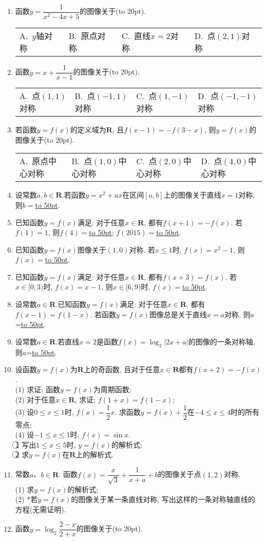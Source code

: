 \documentclass[10pt,a4paper]{article}
\newcommand{\blank}[1]{\underline{\hbox to #1pt{}}}
\newcommand{\bracket}[1]{(\hbox to #1pt{})}
\newcommand{\fourch}[4]{\par\begin{tabular}{p{.23\textwidth}p{.23\textwidth}p{.23\textwidth}p{.23\textwidth}}
A.~#1 &B.~#2& C.~#3& D.~#4
\end{tabular}}
\begin{document}
\begin{enumerate}[1.]
\item 函数$y=\dfrac 1{x^2-4x+5}$的图像关于\bracket{20}.
\fourch{$y$轴对称}{原点对称}{直线$x=2$对称}{点$(2,1)$对称}
\item 函数$y=x+\dfrac 1{x-1}$的图像关于\bracket{20}.
\fourch{点$(1,1)$对称}{点$(-1,1)$对称}{点$(1,-1)$对称}{点$(-1,-1)$对称}
\item 若函数$y=f(x)$的定义域为$\mathbf{R}$, 且$f(x-1)=-f(3-x)$, 则$y=f(x)$的图像关于\bracket{20}.
\fourch{原点中心对称}{点$(1,0)$中心对称}{点$(2,0)$中心对称}{点$(4,0)$中心对称}
\item 设常数$a,b\in \mathbf{R}$.若函数$y=x^2+ax$在区间$[a,b]$上的图像关于直线$x=1$对称, 则$b=$\blank{50}.
\item 已知函数$y=f(x)$满足: 对于任意$x\in \mathbf{R}$, 都有$f(x+1)=-f(x)$. 若$f(1)=1$, 则$f(4)=$\blank{50}; $f(2015)=$\blank{50}.
\item 已知函数$y=f(x)$图像关于$(1,0)$对称. 若$x\le 1$时, $f(x)=x^2-1$, 则$f(x)=$\blank{50}.
\item 已知函数$y=f(x)$满足: 对于任意$x\in \mathbf{R}$, 都有$f(x+3)=f(x)$. 若$x\in [0,3)$时, $f(x)=x-1$, 则$x\in [6,9)$时, $f(x)=$\blank{50}.
\item 设常数$a\in \mathbf{R}$.已知函数$y=f(x)$满足: 对于任意$x\in \mathbf{R}$, 都有$f(x-1)=f(1-x)$. 若函数$y=f(x)$图像总是关于直线$x=a$对称, 则$a$=\blank{50}.
\item 设常数$a\in \mathbf{R}$.若直线$x=2$是函数$f(x)=\log_3|2x+a|$的图像的一条对称轴, 则$a$=\blank{50}.
\item 设函数$y=f(x)$为$\mathbf{R}$上的奇函数, 且对于任意$x\in \mathbf{R}$都有$f(x+2)=-f(x)$.\\
(1) 求证: 函数$y=f(x)$为周期函数;\\
(2) 对于任意$x\in \mathbf{R}$, 求证: $f(1+x)=f(1-x)$;\\
(3) 设$0\le x\le 1$时, $f(x)=\dfrac 12x$. 求函数$y=f(x)+\dfrac 12$在$-4\le x\le 4$时的所有零点;\\
(4) 设$-1\le x\le 1$时, $f(x)=\sin x$.\\
\textcircled{1} 写出$1\le x\le 5$时, $y=f(x)$的解析式;\\
\textcircled{2} 求$y=f(x)$在$\mathbf{R}$上的解析式.
\item 常数$a$、$b\in \mathbf{R}$. 函数$f(x)=\dfrac x{\sqrt 3}+\dfrac 1{x+a}+b$的图像关于点$(1,2)$对称.\\
(1) 求$y=f(x)$的解析式;\\
(2) *若$y=f(x)$的图像关于某一条直线对称, 写出这样的一条对称轴直线的方程(无需证明).
\item 函数$y=\log_2\dfrac{2-x}{2+x}$的图像关于\bracket{20}.

\end{enumerate}
\end{document}
